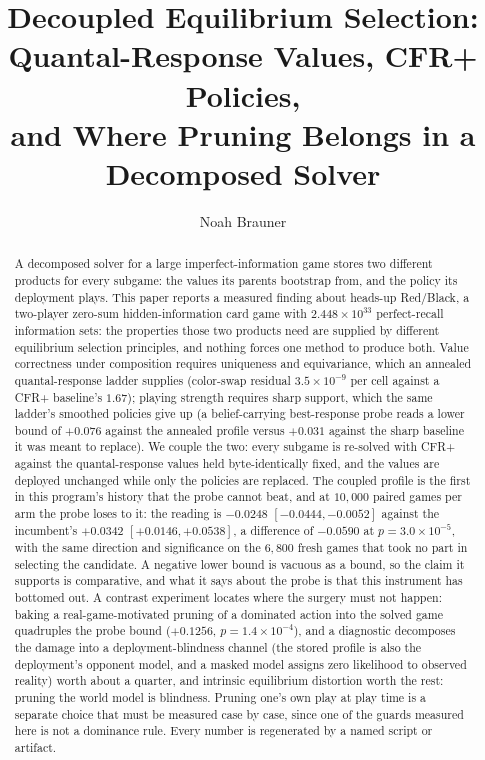 \documentclass[11pt]{article}
\title{\bfseries Decoupled Equilibrium Selection:\\[2pt]
       \large Quantal-Response Values, CFR+ Policies,\\
       and Where Pruning Belongs in a Decomposed Solver}
\author{Noah Brauner}
\date{}
\theoremstyle{plain}
\theoremstyle{definition}
\theoremstyle{remark}
\begin{document}
\maketitle
\vspace{-3.2em}

\begin{abstract}
\noindent
A decomposed solver for a large imperfect-information game stores two
different products for every subgame: the values its parents bootstrap
from, and the policy its deployment plays. This paper reports a measured
finding about heads-up Red/Black, a two-player zero-sum hidden-information
card game with $2.448\times10^{33}$ perfect-recall information sets: the
properties those two products need are supplied by different equilibrium
selection principles, and nothing forces one method to produce both.
Value correctness under composition requires uniqueness and equivariance,
which an annealed quantal-response ladder supplies (color-swap residual
$3.5\times10^{-9}$ per cell against a CFR+ baseline's $1.67$); playing
strength requires sharp support, which the same ladder's smoothed
policies give up (a belief-carrying best-response probe reads a lower
bound of $+0.076$ against the annealed profile versus $+0.031$ against
the sharp baseline it was meant to replace). We couple the two: every
subgame is re-solved with CFR+ against the quantal-response values held
byte-identically fixed, and the values are deployed unchanged while
only the policies are replaced. The coupled profile is the first in this program's
history that the probe cannot beat, and at $10{,}000$ paired games per
arm the probe loses to it: the reading is $-0.0248$ $[-0.0444,
-0.0052]$ against the incumbent's $+0.0342$ $[+0.0146, +0.0538]$,
a difference of $-0.0590$ at $p=3.0\times10^{-5}$, with the same
direction and significance on the $6{,}800$ fresh games that took no
part in selecting the candidate. A negative lower bound is vacuous as a
bound, so the claim it supports is comparative, and what it says about
the probe is that this instrument has bottomed out. A
contrast experiment locates where the surgery must not happen: baking a
real-game-motivated pruning of a dominated action into the solved game
quadruples the probe bound ($+0.1256$, $p=1.4\times10^{-4}$), and a
diagnostic decomposes the damage into a deployment-blindness channel
(the stored profile is also the deployment's opponent model, and a
masked model assigns zero likelihood to observed reality) worth about a
quarter, and intrinsic equilibrium distortion worth the rest: pruning
the world model is blindness. Pruning one's own play at play time is a
separate choice that must be measured case by case, since one of the
guards measured here is not a dominance rule. Every number is
regenerated by a named script or artifact.
\end{abstract}
\end{document}
